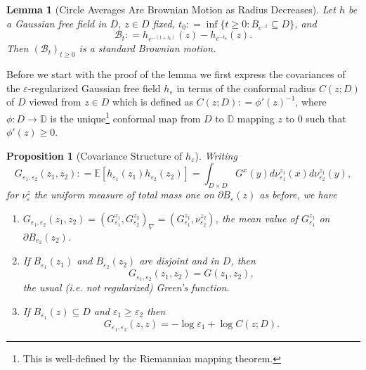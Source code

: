 \documentclass[11pt,reqno]{amsart}
\numberwithin{equation}{section}
\newtheorem{lem}[thm]{Lemma}
\newtheorem{pro}[thm]{Proposition}
\newcommand{\deq}{\mathrel{\mathop:}=}
\newcommand{\eps}{\varepsilon}
\begin{document}
\begin{lem}[Circle Averages Are Brownian Motion as Radius Decreases]\label{lem:hepsIsBM}
	Let $h$ be a Gaussian free field in $D$, $z\in D$ fixed, $t_0\deq\inf\{t\geq 0: B_{e^{-t}}\subseteq D\}$, and $$\mathcal B_t\deq h_{e^{-(t+t_0)}}(z)-h_{e^{-t_0}}(z).$$
	Then $(\mathcal B_t)_{t\geq 0}$ is a standard Brownian motion.
\end{lem}

Before we start with the proof of the lemma we first express the covariances of the $\eps$-regularized Gaussian free field $h_\eps$ in terms of the conformal radius $C(z;D)$ of $D$ viewed from $z\in D$ which is defined as $C(z;D)\deq \phi'(z)^{-1}$, where $\phi:D\rightarrow\mathbb D$ is the unique\footnote{This is well-defined by the Riemannian mapping theorem.} conformal map from $D$ to $\mathbb D$ mapping $z$ to $0$ such that $\phi'(z)\geq 0$.

\begin{pro}[Covariance Structure of $h_\eps$]\label{prop:covariancesOfRegularizedH}
	Writing $$G_{\eps_1,\eps_2}(z_1,z_2) \deq \mathbb E[h_{\eps_1}(z_1)h_{\eps_2}(z_2)] = \int_{D\times D} G^x(y)d\nu_{\eps_1}^{z_1}(x)d\nu_{\eps_2}^{z_1}(y),$$ for $\nu_\eps^z$ the uniform measure of total mass one on $\partial B_\eps(z)$ as before, we have
	\begin{enumerate}
		\item $G_{\eps_1,\eps_2}(z_1,z_2) = (G_{\eps_1}^{z_1},G_{\eps_2}^{z_2})_\nabla = (G_{\eps_1}^{z_1},\nu_{\eps_2}^{z_2})$, the mean value of $G_{\eps_1}^{z_1}$ on $\partial B_{e_2}(z_2)$.
		\item If $B_{\eps_1}(z_1)$ and $B_{\eps_2}(z_2)$ are disjoint and in $D$, then $$G_{\eps_1,\eps_2}(z_1,z_2) = G(z_1,z_2),$$ the usual (i.e. not regularized) Green's function.
		\item\label{item:covarianceForSameZdifferentEps} If $B_{\eps_1}(z)\subseteq D$ and $\eps_1\geq\eps_2$ then $$G_{\eps_1,\eps_2}(z,z)=-\log\eps_1+\log C(z;D).$$
	\end{enumerate}
\end{pro}
\end{document}

